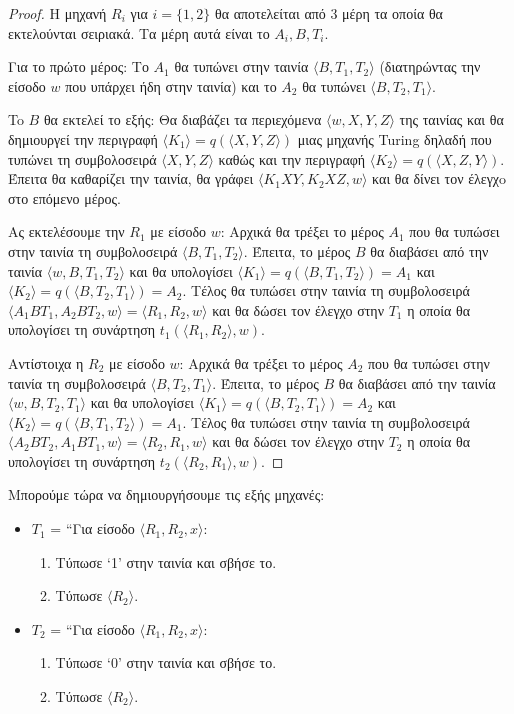 \documentclass[a4paper, oneside, 11pt]{article}
\theoremstyle{definition}
\begin{document}
\begin{proof}
Η μηχανή $R_i$ για $i = \{1, 2\}$ θα αποτελείται από 3 μέρη τα οποία θα
εκτελούνται σειριακά. Τα μέρη αυτά είναι το $A_i, B, T_i$.

Για το πρώτο μέρος: Το $A_1$ θα τυπώνει στην ταινία $\langle B, T_1, T_2
\rangle$ (διατηρώντας την είσοδο $w$ που υπάρχει ήδη στην ταινία) και το $A_2$
θα τυπώνει $\langle B, T_2, T_1 \rangle$. 

To $B$ θα εκτελεί το εξής: Θα διαβάζει τα περιεχόμενα $\langle w, X, Y, Z
\rangle$ της ταινίας και θα δημιουργεί την περιγραφή $\langle K_1 \rangle =
q(\langle X, Y, Z \rangle)$ μιας μηχανής Turing δηλαδή που τυπώνει τη
συμβολοσειρά $\langle X, Y, Z \rangle$ καθώς και την περιγραφή $\langle K_2
\rangle = q(\langle X, Z, Y\rangle)$.  Έπειτα θα καθαρίζει την ταινία, θα γράφει
$\langle K_1XY, K_2XZ, w \rangle$ και θα δίνει τον έλεγχo στο επόμενο μέρος.

Ας εκτελέσουμε την $R_1$ με είσοδο $w$: Αρχικά θα τρέξει το μέρος $A_1$ που θα
τυπώσει στην ταινία τη συμβολοσειρά $\langle B, T_1, T_2 \rangle$. Έπειτα, το
μέρος $B$ θα διαβάσει από την ταινία $\langle w, B, T_1, T_2 \rangle$ και θα
υπολογίσει $\langle K_1 \rangle = q(\langle B, T_1, T_2 \rangle) = A_1$ και
$\langle K_2 \rangle = q(\langle B, T_2, T_1 \rangle) = A_2$. Τέλος θα τυπώσει
στην ταινία τη συμβολοσειρά $\langle A_1BT_1, A_2BT_2, w \rangle = \langle R_1,
R_2, w\rangle$ και θα δώσει τον έλεγχο στην $T_1$ η οποία θα υπολογίσει τη
συνάρτηση $t_1(\langle R_1, R_2 \rangle, w)$.

Αντίστοιχα η $R_2$ με είσοδο $w$: Αρχικά θα τρέξει το μέρος $A_2$ που θα
τυπώσει στην ταινία τη συμβολοσειρά $\langle B, T_2, T_1 \rangle$. Έπειτα, το
μέρος $B$ θα διαβάσει από την ταινία $\langle w, B, T_2, T_1 \rangle$ και θα
υπολογίσει $\langle K_1 \rangle = q(\langle B, T_2, T_1 \rangle) = A_2$ και
$\langle K_2 \rangle = q(\langle B, T_1, T_2 \rangle) = A_1$. Τέλος θα τυπώσει
στην ταινία τη συμβολοσειρά $\langle A_2BT_2, A_1BT_1, w \rangle = \langle R_2,
R_1, w\rangle$ και θα δώσει τον έλεγχο στην $T_2$ η οποία θα υπολογίσει τη
συνάρτηση $t_2(\langle R_2, R_1 \rangle, w)$.
\end{proof}

Μπορούμε τώρα να δημιουργήσουμε τις εξής μηχανές:

\begin{itemize}
\item $T_1$ = ``Για είσοδο $\langle R_1, R_2, x \rangle$:
\begin{enumerate}
\item Τύπωσε `1' στην ταινία και σβήσε το.
\item Τύπωσε $\langle R_2 \rangle$.
\end{enumerate}
\item $T_2$ = ``Για είσοδο $\langle R_1, R_2, x \rangle$:
\begin{enumerate}
\item Τύπωσε `0' στην ταινία και σβήσε το.
\item Τύπωσε $\langle R_2 \rangle$.
\end{enumerate}
\end{itemize}
\end{document}
